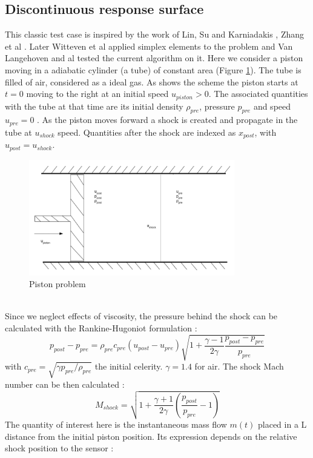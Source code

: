 \documentclass[11pt, a4paper, English]{report}
\begin{document}
\begin{appendix}
\section{Discontinuous response surface}
This classic test case is inspired by the work of Lin, Su and Karniadakis \cite{Piston1}, Zhang et al \cite{Piston2}. Later Witteven et al \cite{Piston3} applied simplex elements to the problem and Van Langehoven and al \cite{PistonAnca} tested the current algorithm on it. Here we consider a piston moving in a adiabatic cylinder (a tube) of constant area (Figure \ref{schemapiston}). The tube is filled of air, considered as a ideal gas. As shows the scheme the piston starts at $t=0$ moving to the right at an initial speed $u_{piston}>0$. The associated quantities with the tube at that time are its initial density $\rho_{pre}$, pressure $p_{pre}$ and speed $u_{pre} = 0$
. As the piston moves forward a shock is created and propagate in the tube at $u_{shock}$ speed. Quantities after the shock are indexed as $x_{post}$, with $u_{post} = u_{shock}$. 
\begin{figure}[h!]
    \centering
    \includegraphics[width = 0.8\textwidth]{F1long.png}
    \caption{Piston problem \cite{Piston1}}
    \label{schemapiston}
\end{figure}\\
Since we neglect effects of viscosity, the pressure behind the shock can be calculated with the Rankine-Hugoniot formulation :
$$ p_{post} - p_{pre} = \rho_{pre}c_{pre}(u_{post}- u_{pre})\sqrt{1+\frac{\gamma - 1}{2\gamma} \frac{p_{post} - p_{pre}}{p_{pre}}} $$
with $c_{pre} = \sqrt{\gamma p_{pre}/\rho_{pre}}$ the initial celerity. $\gamma = 1.4$ for air. The shock Mach number can be then calculated \cite{PistonAnca}:
$$ M_{shock} = \sqrt{1+\frac{\gamma + 1}{2\gamma}(\frac{p_{post}}{p_{pre}}-1)}$$
The quantity of interest here is the instantaneous mass flow $m(t)$ placed in a L distance from the initial piston position. Its expression depends on the relative shock position to the sensor :

\end{appendix}
\end{document}
